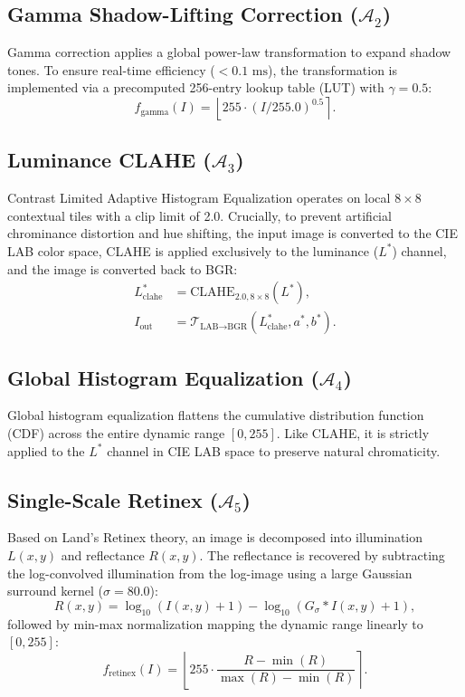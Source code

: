 \documentclass[journal]{IEEEtran}
\begin{document}
\subsection{Gamma Shadow-Lifting Correction ($\mathcal{A}_2$)}
Gamma correction applies a global power-law transformation to expand shadow tones. To ensure real-time efficiency ($<0.1\text{ ms}$), the transformation is implemented via a precomputed 256-entry lookup table (LUT) with $\gamma = 0.5$:
\begin{equation}
f_{\text{gamma}}(I) = \left\lfloor 255 \cdot (I / 255.0)^{0.5} \right\rceil.
\end{equation}

\subsection{Luminance CLAHE ($\mathcal{A}_3$)}
Contrast Limited Adaptive Histogram Equalization operates on local $8 \times 8$ contextual tiles with a clip limit of 2.0. Crucially, to prevent artificial chrominance distortion and hue shifting, the input image is converted to the CIE LAB color space, CLAHE is applied exclusively to the luminance ($L^*$) channel, and the image is converted back to BGR:
\begin{align}
L^*_{\text{clahe}} &= \text{CLAHE}_{2.0, 8\times 8}(L^*), \\
I_{\text{out}} &= \mathcal{T}_{\text{LAB}\to\text{BGR}}(L^*_{\text{clahe}}, a^*, b^*).
\end{align}

\subsection{Global Histogram Equalization ($\mathcal{A}_4$)}
Global histogram equalization flattens the cumulative distribution function (CDF) across the entire dynamic range $[0, 255]$. Like CLAHE, it is strictly applied to the $L^*$ channel in CIE LAB space to preserve natural chromaticity.

\subsection{Single-Scale Retinex ($\mathcal{A}_5$)}
Based on Land's Retinex theory, an image is decomposed into illumination $L(x, y)$ and reflectance $R(x, y)$. The reflectance is recovered by subtracting the log-convolved illumination from the log-image using a large Gaussian surround kernel ($\sigma = 80.0$):
\begin{equation}
R(x, y) = \log_{10}(I(x, y) + 1) - \log_{10}(G_{\sigma} * I(x, y) + 1),
\end{equation}
followed by min-max normalization mapping the dynamic range linearly to $[0, 255]$:
\begin{equation}
f_{\text{retinex}}(I) = \left\lfloor 255 \cdot \frac{R - \min(R)}{\max(R) - \min(R)} \right\rceil.
\end{equation}
\end{document}
